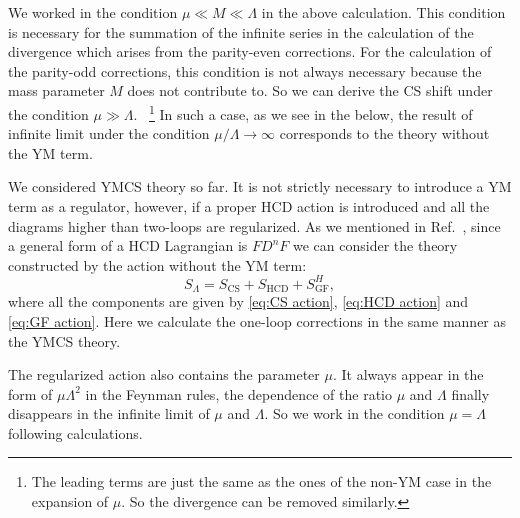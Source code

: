\documentclass[a4paper,12pt]{article}
\begin{document}
%
We worked in the condition $\mu \ll M \ll \Lambda$ in the above calculation.
%
This condition is necessary for the summation of the infinite series
in the calculation of the divergence
which arises from the parity-even corrections.
%
For the calculation of the parity-odd corrections,
this condition is not always necessary
because the mass parameter $M$ does not contribute to.
%
So we can derive the CS shift under the condition $\mu \gg \Lambda$.%
~\footnote{%
  The leading terms are just the same as the ones of the non-YM case
  in the expansion of $\mu$.
  So the divergence can be removed similarly.
  }
%
In such a case, as we see in the below,
the result of infinite limit
under the condition $\mu /\Lambda \rightarrow \infty$
corresponds to the theory without the YM term.



\label{sec:CS+p-even HCD}

We considered YMCS theory so far.
%
It is not strictly necessary to introduce a YM term as a regulator, however,
if a proper HCD action is introduced and
all the diagrams higher than two-loops are regularized.
%
As we mentioned in Ref.~\cite{Nittoh:1998ey},
since a general form of a HCD Lagrangian is $FD^nF$
we can consider the theory constructed by the action
without the YM term:
%
\begin{equation}
S_\Lambda = S_\mathrm{CS}  + S_\mathrm{HCD} + S_\mathrm{GF}^H,
\end{equation}
%
where all the components are given by
\eqref{eq:CS action}, \eqref{eq:HCD action} and \eqref{eq:GF action}.
%
Here we calculate the one-loop corrections
in the same manner as the YMCS theory.
%

The regularized action also contains the parameter $\mu$.
%
It always appear in the form of $\mu\Lambda^2$ in the Feynman rules,
the dependence of the ratio $\mu$ and $\Lambda$
finally disappears in the infinite limit of $\mu$ and $\Lambda$.
%
So we work in the condition $\mu = \Lambda$ following calculations.
\end{document}

